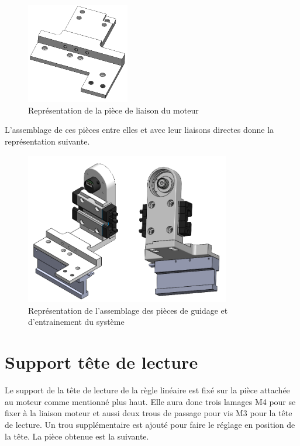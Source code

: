 \begin{figure}[H]
  \centering
  \includegraphics[width = 0.4\textwidth]{assets/figures/LiaisonMoteur.png}
  \caption{Représentation de la pièce de liaison du moteur}
  \label{fig:LiaisonMoteur}
\end{figure}

L'assemblage de ces pièces entre elles et avec leur liaisons directes donne la représentation suivante.

\begin{figure}[H]
  \centering
  \includegraphics[width = 0.8\textwidth]{assets/figures/AssemblageGuidageEntrainement.png}
  \caption{Représentation de l'assemblage des pièces de guidage et d'entrainement du système}
  \label{fig:AssGuiEntr}
\end{figure}

\section{Support tête de lecture}\label{sec:SupTeteLect}
Le support de la tête de lecture de la règle linéaire est fixé sur la pièce attachée au moteur comme mentionné plus haut. Elle aura donc trois
lamages M4 pour se fixer à la liaison moteur et aussi deux trous de passage pour vis M3 pour la tête de lecture. Un trou supplémentaire est ajouté
pour faire le réglage en position de la tête. La pièce obtenue est la suivante.

